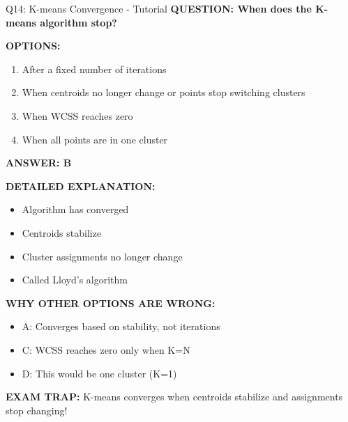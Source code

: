 \documentclass[8pt]{beamer}
\begin{document}
	\begin{frame}{Q14: K-means Convergence - Tutorial}
		\fontsize{6.5}{7.5}\selectfont
		\textbf{QUESTION: When does the K-means algorithm stop?}
		
		\vspace{0.1cm}
		\textbf{OPTIONS:}
		\begin{enumerate}
			\item After a fixed number of iterations
			\item When centroids no longer change or points stop switching clusters
			\item When WCSS reaches zero
			\item When all points are in one cluster
		\end{enumerate}
		
		\vspace{0.1cm}
		\textcolor{myblue}{\textbf{ANSWER: B}}
		
		\vspace{0.1cm}
		\textbf{DETAILED EXPLANATION:}
		\begin{itemize}
			\item Algorithm has converged
			\item Centroids stabilize
			\item Cluster assignments no longer change
			\item Called Lloyd's algorithm
		\end{itemize}
		
		\vspace{0.1cm}
		\textcolor{myred}{\textbf{WHY OTHER OPTIONS ARE WRONG:}}
		\begin{itemize}
			\item \textcolor{myred}{A:} Converges based on stability, not iterations
			\item \textcolor{myred}{C:} WCSS reaches zero only when K=N
			\item \textcolor{myred}{D:} This would be one cluster (K=1)
		\end{itemize}
		
		\textcolor{myred}{\textbf{EXAM TRAP:}} K-means converges when \textcolor{myblue}{centroids stabilize and assignments stop changing}!
	\end{frame}
	
\end{document}
